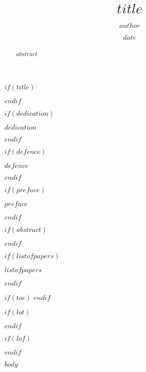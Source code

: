 \documentclass[twoside,10pt]{gihclass} %
\title{$title$}
\author{$author$}
\date{$date$}
\begin{document}


\frontmatter %
$if(title)$
  \maketitle
$endif$

$if(dedication)$
  \begin{dedication}
\vspace*{\fill}
 $dedication$
\vspace*{\fill}
  \end{dedication}
$endif$


$if(defence)$
\begin{defence}
    $defence$
  \end{defence}
$endif$

$if(preface)$
  \begin{preface}
    $preface$
  \end{preface}
$endif$


$if(abstract)$
  \begin{abstract}
    $abstract$
  \end{abstract}
$endif$

$if(listofpapers)$
  \begin{listofpapers}
    $listofpapers$
  \end{listofpapers}
$endif$


$if(toc)$
  \hypersetup{linkcolor=$if(toccolor)$$toccolor$$else$black$endif$}
  \setcounter{tocdepth}{$toc-depth$}
  \tableofcontents
$endif$

$if(lot)$
  \listoftables
$endif$

$if(lof)$
  \listoffigures
$endif$




\mainmatter %
\pagestyle{fancyplain} %

$body$


\end{document}
